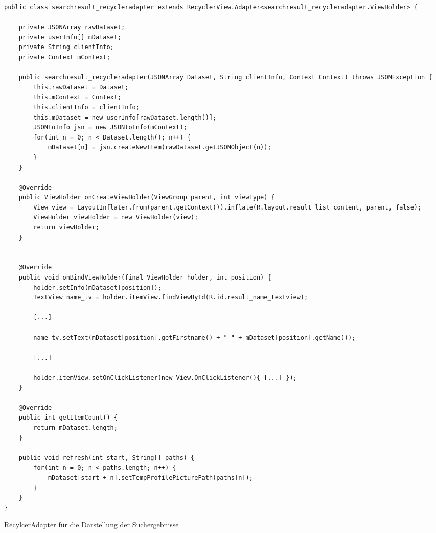 \documentclass[a4paper,11pt]{report}
\newenvironment{code}{\captionsetup{type=figure}}{}
\begin{document}
\begin{code}
	\begin{center}
		\begin{verbatim}
public class searchresult_recycleradapter extends RecyclerView.Adapter<searchresult_recycleradapter.ViewHolder> {

	private JSONArray rawDataset;
	private userInfo[] mDataset;
	private String clientInfo;
	private Context mContext;

	public searchresult_recycleradapter(JSONArray Dataset, String clientInfo, Context Context) throws JSONException {
		this.rawDataset = Dataset;
		this.mContext = Context;
		this.clientInfo = clientInfo;
		this.mDataset = new userInfo[rawDataset.length()];
		JSONtoInfo jsn = new JSONtoInfo(mContext);
		for(int n = 0; n < Dataset.length(); n++) {
			mDataset[n] = jsn.createNewItem(rawDataset.getJSONObject(n));
		}
	}

	@Override
	public ViewHolder onCreateViewHolder(ViewGroup parent, int viewType) {
		View view = LayoutInflater.from(parent.getContext()).inflate(R.layout.result_list_content, parent, false);
		ViewHolder viewHolder = new ViewHolder(view);
		return viewHolder;
	}

	
	@Override
	public void onBindViewHolder(final ViewHolder holder, int position) {
		holder.setInfo(mDataset[position]);
		TextView name_tv = holder.itemView.findViewById(R.id.result_name_textview);
	
		[...]

		name_tv.setText(mDataset[position].getFirstname() + " " + mDataset[position].getName());

		[...]

		holder.itemView.setOnClickListener(new View.OnClickListener(){ [...] });
	}

	@Override
	public int getItemCount() {
		return mDataset.length;
	}

	public void refresh(int start, String[] paths) {
		for(int n = 0; n < paths.length; n++) {
			mDataset[start + n].setTempProfilePicturePath(paths[n]);
		}
	}
}
		\end{verbatim}
	\end{center}
\caption{RecylcerAdapter für die Darstellung der Suchergebnisse}
\label{java:recAdapter}
\end{code}
\bigskip
\end{document}
